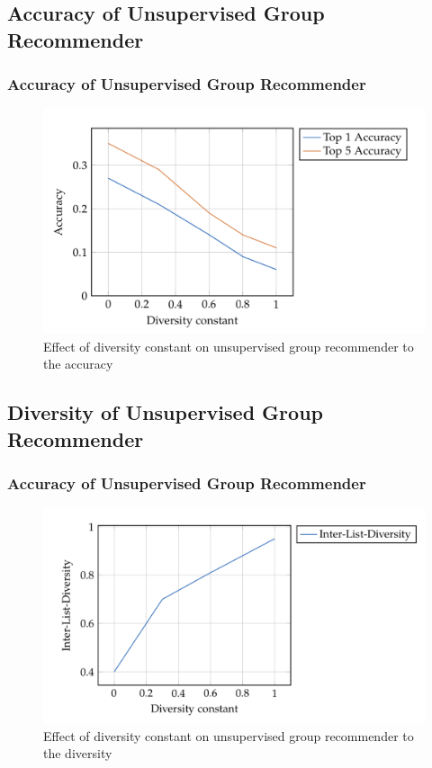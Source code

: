 \documentclass{beamer}
\begin{document}
\subsection{Accuracy of Unsupervised Group Recommender} 
\begin{frame}
\frametitle{Accuracy of Unsupervised Group Recommender}
\begin{figure}
	\includegraphics[scale=0.4]{images/diversity-unsupervised-group-accuracy} 
	\caption{Effect of diversity constant on unsupervised group recommender to the accuracy}
\end{figure}
\end{frame}

\subsection{Diversity of Unsupervised Group Recommender} 
\begin{frame}
\frametitle{Accuracy of Unsupervised Group Recommender}
\begin{figure}
	\includegraphics[scale=0.4]{images/unsupervised-group-diversity} 
	\caption{Effect of diversity constant on unsupervised group recommender to the diversity}
\end{figure}
\end{frame}
\end{document}
